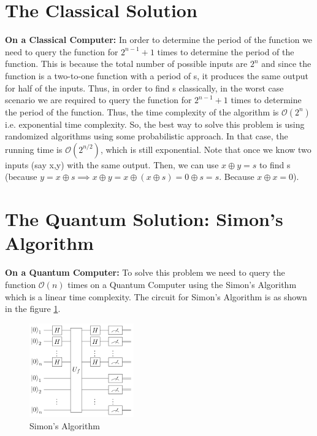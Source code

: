 \documentclass[12pt, oneside]{book}
\theoremstyle{definition}
\theoremstyle{definition}
\theoremstyle{remark}
\begin{document}
\section{The Classical Solution}
\textbf{On a Classical Computer: }In order to determine the period of the function we need to query the function for $2^{n-1}+1$ times to determine the period of the function.
This is because the total number of possible inputs are $2^n$ and since the function is a two-to-one function with a period of s, it produces the same output for half of the inputs.
Thus, in order to find s classically, in the worst case scenario we are required to query the function for $2^{n-1}+1$ times to determine the period of the function.
Thus, the time complexity of the algorithm is $\mathcal{O}(2^n)$ i.e. exponential time complexity. So, the best way to solve this problem is using randomized algorithms using some probabilistic approach. In that case, 
the running time is $\mathcal{O}(2^{n/2})$, which is still exponential. Note that once we know two inputs (say x,y) with the same output. Then, we can use $x \oplus y=s$ to find s (because $y=x\oplus s\implies x \oplus y=x\oplus (x \oplus s) = 0\oplus s=s$. Because $x \oplus x=0$).

\section{The Quantum Solution: Simon's Algorithm}
\textbf{On a Quantum Computer: }To solve this problem we need to query the function $\mathcal{O}(n)$ times on a Quantum Computer using the Simon's Algorithm which is a linear time complexity.
The circuit for Simon's Algorithm is as shown in the figure \ref{fig:simon}.
\begin{figure}[H]
    \centering
    \includegraphics[width=0.4\textwidth]{../images/Simon.png}
    \caption{Simon's Algorithm}
    \label{fig:simon}
\end{figure}
\end{document}
